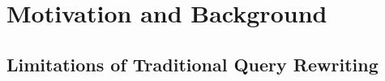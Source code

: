 \section{Motivation and Background}
\label{gen:sec:motivation}

\subsection{Limitations of Traditional Query Rewriting}

